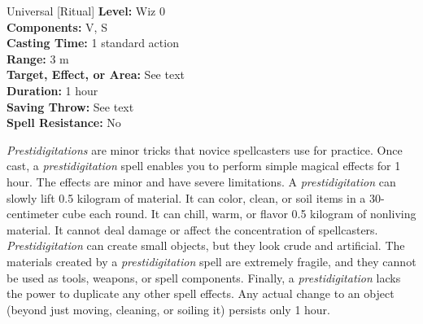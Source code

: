 {Universal [Ritual]}
{
	\textbf{Level:}
	Wiz 0\\
	\textbf{Components:}
	V, S\\
	\textbf{Casting Time:}
	1 standard action\\
	\textbf{Range:}
	3 m\\
	\textbf{Target, Effect, or Area:}
	See text\\
	\textbf{Duration:}
	1 hour\\
	\textbf{Saving Throw:}
	See text\\
	\textbf{Spell Resistance:}
	No\\
}
{
	\emph{Prestidigitations} are minor tricks that novice spellcasters use for practice. Once cast, a \emph{prestidigitation} spell enables you to perform simple magical effects for 1 hour. The effects are minor and have severe limitations. A \emph{prestidigitation} can slowly lift 0.5 kilogram of material. It can color, clean, or soil items in a 30-centimeter cube each round. It can chill, warm, or flavor 0.5 kilogram of nonliving material. It cannot deal damage or affect the concentration of spellcasters. \emph{Prestidigitation} can create small objects, but they look crude and artificial. The materials created by a \emph{prestidigitation} spell are extremely fragile, and they cannot be used as tools, weapons, or spell components. Finally, a \emph{prestidigitation} lacks the power to duplicate any other spell effects. Any actual change to an object (beyond just moving, cleaning, or soiling it) persists only 1 hour.

}
